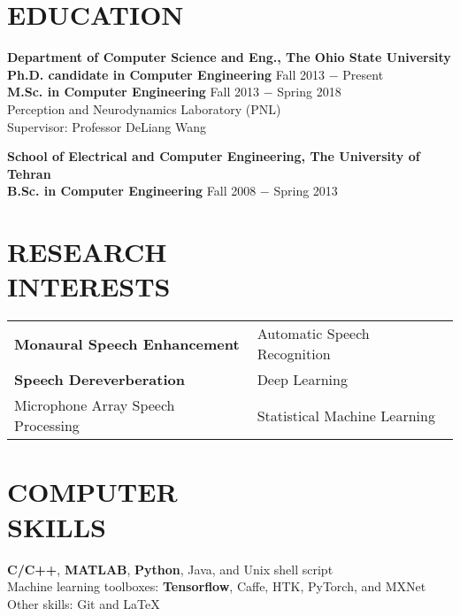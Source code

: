 \documentclass[margin, 10pt]{res}
\begin{document}
\begin{resume}

\section{EDUCATION}
\textbf{Department of Computer Science and Eng., The Ohio State University }  \\
\textbf{Ph.D. candidate in Computer Engineering} \hfill {\footnotesize Fall 2013 $-$ Present} \\
\textbf{M.Sc. in Computer Engineering} \hfill {\footnotesize Fall 2013 $-$ Spring 2018} \\
Perception and Neurodynamics Laboratory (PNL)\\
Supervisor: Professor DeLiang Wang

\textbf{School of Electrical and Computer Engineering, The University of Tehran}\\
\textbf{B.Sc. in Computer Engineering} \hfill {\footnotesize Fall 2008 $-$ Spring 2013} 

\section{RESEARCH\\INTERESTS}
\begin{tabular}{l l}
\textbf{Monaural Speech Enhancement}    & \hspace{0.3in}   Automatic Speech Recognition\\ 
\textbf{Speech Dereverberation}    & \hspace{0.3in}    Deep Learning\\ 
Microphone Array Speech Processing  & \hspace{0.3in} Statistical Machine Learning
\end{tabular}

\section{COMPUTER \\ SKILLS}
\textbf{C/C++}, \textbf{MATLAB}, \textbf{Python}, Java, and Unix shell script\\
Machine learning toolboxes: \textbf{Tensorflow},
Caffe, HTK, PyTorch, and MXNet\\
Other skills: Git and LaTeX


\end{resume}
\end{document}
